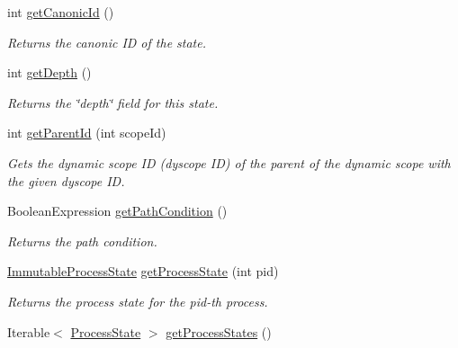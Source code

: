 \begin{DoxyCompactItemize}
\item 
int \hyperlink{classedu_1_1udel_1_1cis_1_1vsl_1_1civl_1_1state_1_1common_1_1immutable_1_1ImmutableState_a31334e91bf9b5cb1893d910ce2c05129}{get\+Canonic\+Id} ()
\begin{DoxyCompactList}\small\item\em Returns the canonic I\+D of the state. \end{DoxyCompactList}\item 
int \hyperlink{classedu_1_1udel_1_1cis_1_1vsl_1_1civl_1_1state_1_1common_1_1immutable_1_1ImmutableState_a6af7109acaff550fb21077d8eb072c91}{get\+Depth} ()
\begin{DoxyCompactList}\small\item\em Returns the \char`\"{}depth\char`\"{} field for this state. \end{DoxyCompactList}\item 
int \hyperlink{classedu_1_1udel_1_1cis_1_1vsl_1_1civl_1_1state_1_1common_1_1immutable_1_1ImmutableState_a32a84f56870dbec43f88c07306d37076}{get\+Parent\+Id} (int scope\+Id)
\begin{DoxyCompactList}\small\item\em Gets the dynamic scope I\+D (dyscope I\+D) of the parent of the dynamic scope with the given dyscope I\+D. \end{DoxyCompactList}\item 
Boolean\+Expression \hyperlink{classedu_1_1udel_1_1cis_1_1vsl_1_1civl_1_1state_1_1common_1_1immutable_1_1ImmutableState_a06d95fc1b1fbc2c1d4e2a09c7db60fbe}{get\+Path\+Condition} ()
\begin{DoxyCompactList}\small\item\em Returns the path condition. \end{DoxyCompactList}\item 
\hyperlink{classedu_1_1udel_1_1cis_1_1vsl_1_1civl_1_1state_1_1common_1_1immutable_1_1ImmutableProcessState}{Immutable\+Process\+State} \hyperlink{classedu_1_1udel_1_1cis_1_1vsl_1_1civl_1_1state_1_1common_1_1immutable_1_1ImmutableState_aff7334a6eb3d96722ca8f5263e9b2e9f}{get\+Process\+State} (int pid)
\begin{DoxyCompactList}\small\item\em Returns the process state for the pid-\/th process. \end{DoxyCompactList}\item 
Iterable$<$ \hyperlink{interfaceedu_1_1udel_1_1cis_1_1vsl_1_1civl_1_1state_1_1IF_1_1ProcessState}{Process\+State} $>$ \hyperlink{classedu_1_1udel_1_1cis_1_1vsl_1_1civl_1_1state_1_1common_1_1immutable_1_1ImmutableState_acd3ef3ca14401627d6ee2bbbbeee7de1}{get\+Process\+States} ()

\end{DoxyCompactItemize}
